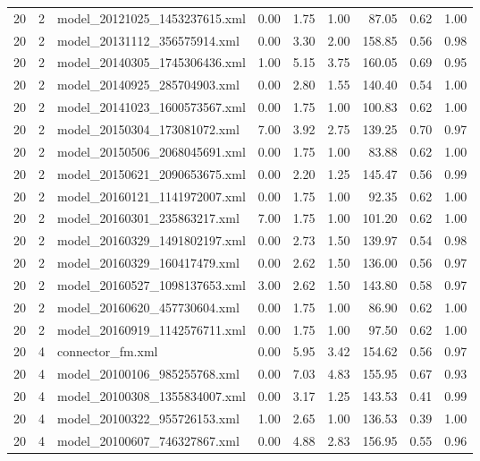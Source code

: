 \begin{table}[ht]
\begin{tabular}{rrlrrrrrr}
   20 &   2 & model\_20121025\_1453237615.xml & 0.00 & 1.75 & 1.00 & 87.05 & 0.62 & 1.00 \\ 
   20 &   2 & model\_20131112\_356575914.xml & 0.00 & 3.30 & 2.00 & 158.85 & 0.56 & 0.98 \\ 
   20 &   2 & model\_20140305\_1745306436.xml & 1.00 & 5.15 & 3.75 & 160.05 & 0.69 & 0.95 \\ 
   20 &   2 & model\_20140925\_285704903.xml & 0.00 & 2.80 & 1.55 & 140.40 & 0.54 & 1.00 \\ 
   20 &   2 & model\_20141023\_1600573567.xml & 0.00 & 1.75 & 1.00 & 100.83 & 0.62 & 1.00 \\ 
   20 &   2 & model\_20150304\_173081072.xml & 7.00 & 3.92 & 2.75 & 139.25 & 0.70 & 0.97 \\ 
   20 &   2 & model\_20150506\_2068045691.xml & 0.00 & 1.75 & 1.00 & 83.88 & 0.62 & 1.00 \\ 
   20 &   2 & model\_20150621\_2090653675.xml & 0.00 & 2.20 & 1.25 & 145.47 & 0.56 & 0.99 \\ 
   20 &   2 & model\_20160121\_1141972007.xml & 0.00 & 1.75 & 1.00 & 92.35 & 0.62 & 1.00 \\ 
   20 &   2 & model\_20160301\_235863217.xml & 7.00 & 1.75 & 1.00 & 101.20 & 0.62 & 1.00 \\ 
   20 &   2 & model\_20160329\_1491802197.xml & 0.00 & 2.73 & 1.50 & 139.97 & 0.54 & 0.98 \\ 
   20 &   2 & model\_20160329\_160417479.xml & 0.00 & 2.62 & 1.50 & 136.00 & 0.56 & 0.97 \\ 
   20 &   2 & model\_20160527\_1098137653.xml & 3.00 & 2.62 & 1.50 & 143.80 & 0.58 & 0.97 \\ 
   20 &   2 & model\_20160620\_457730604.xml & 0.00 & 1.75 & 1.00 & 86.90 & 0.62 & 1.00 \\ 
   20 &   2 & model\_20160919\_1142576711.xml & 0.00 & 1.75 & 1.00 & 97.50 & 0.62 & 1.00 \\ 
   20 &   4 & connector\_fm.xml & 0.00 & 5.95 & 3.42 & 154.62 & 0.56 & 0.97 \\ 
   20 &   4 & model\_20100106\_985255768.xml & 0.00 & 7.03 & 4.83 & 155.95 & 0.67 & 0.93 \\ 
   20 &   4 & model\_20100308\_1355834007.xml & 0.00 & 3.17 & 1.25 & 143.53 & 0.41 & 0.99 \\ 
   20 &   4 & model\_20100322\_955726153.xml & 1.00 & 2.65 & 1.00 & 136.53 & 0.39 & 1.00 \\ 
   20 &   4 & model\_20100607\_746327867.xml & 0.00 & 4.88 & 2.83 & 156.95 & 0.55 & 0.96 \\ 

\end{tabular}
\end{table}
